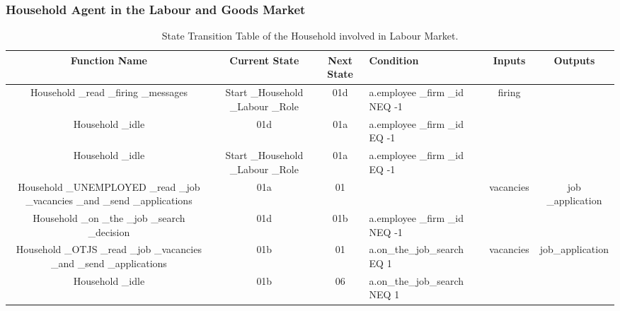 \subsubsection{Household Agent in the Labour and Goods Market}

\begin{landscape}
\begin{table}[!htb]\caption{State Transition Table of the Household involved in Labour Market.}
\begin{center}
\begin{tabular}{|c|c|c|l|c|c|}
\hline
Function Name & Current State & Next State & Condition & Inputs & Outputs\\
\hline

{\parbox[l]{5cm}{Household \_read \_firing \_messages}}&
{\parbox[l]{3cm}{Start \_Household \_Labour \_Role}}&
{\parbox[l]{3cm}{01d}}&{\parbox[l]{3cm}{a.employee \_firm \_id NEQ
-1}}
 & {\parbox[l]{3cm}{firing}}&
\\
\hline

{\parbox[l]{5cm}{Household \_idle}}& {\parbox[l]{3cm}{01d}}&
{\parbox[l]{3cm}{01a}}& {\parbox[l]{3cm}{a.employee \_firm \_id EQ
-1}}& &\\
\hline


{\parbox[l]{5cm}{Household \_idle}}& {\parbox[l]{3cm}{Start
\_Household \_Labour \_Role}}& {\parbox[l]{3cm}{01a}}&
{\parbox[l]{3cm}{a.employee \_firm \_id EQ -1}}& & \\
\hline



{\parbox[l]{5cm}{Household \_UNEMPLOYED \_read \_job \_vacancies
\_and \_send \_applications}}& {\parbox[l]{3cm}{01a}}&
{\parbox[l]{3cm}{01}}& & {\parbox[l]{3cm}{vacancies}}
 &{\parbox[l]{3cm}{job \_application}}
\\
\hline

{\parbox[l]{5cm}{Household \_on \_the \_job \_search \_decision}}&
{\parbox[l]{3cm}{01d}}&
{\parbox[l]{3cm}{01b}}&{\parbox[l]{3cm}{a.employee \_firm \_id NEQ
-1}}
 & &
\\
\hline

{\parbox[l]{5cm}{Household \_OTJS \_read \_job \_vacancies \_and
\_send \_applications}}& {\parbox[l]{3cm}{01b}}&
{\parbox[l]{3cm}{01}}&{\parbox[l]{3cm}{a.on\_the\_job\_search EQ
1}}&{\parbox[l]{3cm}{vacancies}}&
{\parbox[l]{3cm}{job\_application}}
\\
\hline


{\parbox[l]{5cm}{Household \_idle}}& {\parbox[l]{3cm}{01b}}&
{\parbox[l]{3cm}{06}}& {\parbox[l]{3cm}{a.on\_the\_job\_search NEQ
1}}&&
\\




\end{tabular}
\end{center}
\end{table}
\end{landscape}
